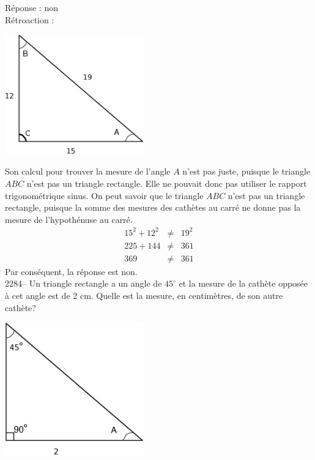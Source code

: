 \documentclass[letterpaper, 12pt]{article}
\begin{document}
R\'eponse : non\\

R\'etroaction :\\
\begin{center}
 \includegraphics[width=6cm,bb=14 14 607 535]{Triangle_rectangle2282.eps}
\end{center}
Son calcul pour trouver la mesure de l'angle $A$ n'est pas juste, puisque le triangle $ABC$ n'est pas un triangle rectangle. Elle ne pouvait donc pas utiliser le rapport trigonom\'etrique sinus. On peut savoir que le triangle $ABC$ n'est pas un triangle rectangle, puisque la somme des mesures des cath\`etes au carr\'e ne donne pas la mesure de l'hypoth\'enuse au carr\'e.
\begin{eqnarray*}
15^{2}+12^{2}&\neq&19^{2}\\
225+144&\neq&361\\
369&\neq&361
\end{eqnarray*}
Par cons\'equent, la r\'eponse est non.\\

2284-- Un triangle rectangle a un angle de $45^{\circ}$ et la mesure de la cath\`ete oppos\'ee \`a cet angle est de 2 cm. Quelle est la mesure, en centim\`etres, de son autre cath\`ete? \\
\begin{center}
 \includegraphics[width=6cm,bb=14 14 576 513]{Triangle_rectangle2284.eps}
\end{center}
\end{document}
